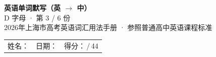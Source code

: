 \documentclass[10pt,a4paper]{article}
\begin{document}
\pagestyle{plain}

\begin{center}
{\LARGE\bfseries 英语单词默写（英 $\to$ 中）}\\[0.22em]
{\large D 字母 · 第 3 / 6 份}\\[0.18em]
{\small 2026年上海市高考英语词汇用法手册 · 参照普通高中英语课程标准}
\end{center}

\vspace{0.25em}
\noindent\begin{tabular}{@{}p{}@{}p{}@{}p{}@{}}
姓名：\underline{\hspace{2.0cm}} & 日期：\underline{\hspace{2.0cm}} & 得分：\underline{\hspace{1.3cm}}\,/\,44 \\
\end{tabular}

\vspace{0.3em}

\vspace{0.08em}
\end{document}
